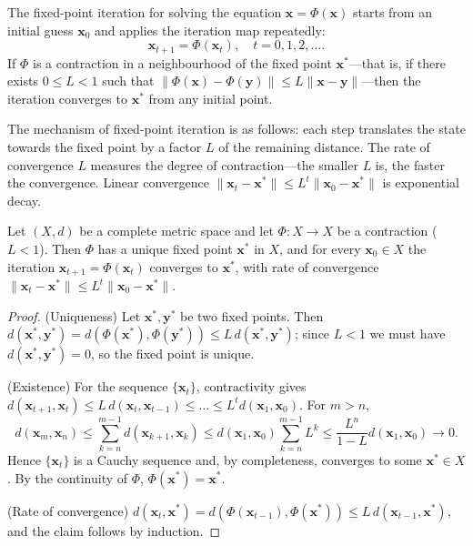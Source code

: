 \begin{definition}\label{def:fixed_point_iteration}
The fixed-point iteration for solving the equation $\mathbf{x} = \Phi(\mathbf{x})$ starts from an initial guess $\mathbf{x}_0$ and applies the iteration map repeatedly:
\[
\mathbf{x}_{t+1} = \Phi(\mathbf{x}_t), \quad t = 0, 1, 2, \dots.
\]
If $\Phi$ is a contraction in a neighbourhood of the fixed point $\mathbf{x}^*$---that is, if there exists $0 \le L < 1$ such that $\|\Phi(\mathbf{x}) - \Phi(\mathbf{y})\| \le L \|\mathbf{x} - \mathbf{y}\|$---then the iteration converges to $\mathbf{x}^*$ from any initial point.

The mechanism of fixed-point iteration is as follows: each step translates the state towards the fixed point by a factor $L$ of the remaining distance. The rate of convergence $L$ measures the degree of contraction---the smaller $L$ is, the faster the convergence. Linear convergence $\|\mathbf{x}_t - \mathbf{x}^*\| \le L^t \|\mathbf{x}_0 - \mathbf{x}^*\|$ is exponential decay.
\end{definition}

\begin{theorem}\label{thm:banach_fixed_point_algo}
Let $(X, d)$ be a complete metric space and let $\Phi: X \to X$ be a contraction ($L < 1$). Then $\Phi$ has a unique fixed point $\mathbf{x}^*$ in $X$, and for every $\mathbf{x}_0 \in X$ the iteration $\mathbf{x}_{t+1} = \Phi(\mathbf{x}_t)$ converges to $\mathbf{x}^*$, with rate of convergence $\|\mathbf{x}_t - \mathbf{x}^*\| \le L^t \|\mathbf{x}_0 - \mathbf{x}^*\|$.
\end{theorem}

\begin{proof}
(Uniqueness) Let $\mathbf{x}^*, \mathbf{y}^*$ be two fixed points. Then $d(\mathbf{x}^*, \mathbf{y}^*) = d(\Phi(\mathbf{x}^*), \Phi(\mathbf{y}^*)) \le L\, d(\mathbf{x}^*, \mathbf{y}^*)$; since $L < 1$ we must have $d(\mathbf{x}^*, \mathbf{y}^*) = 0$, so the fixed point is unique.

(Existence) For the sequence $\{\mathbf{x}_t\}$, contractivity gives $d(\mathbf{x}_{t+1}, \mathbf{x}_t) \le L\, d(\mathbf{x}_t, \mathbf{x}_{t-1}) \le \dots \le L^t d(\mathbf{x}_1, \mathbf{x}_0)$. For $m > n$,
\[
d(\mathbf{x}_m, \mathbf{x}_n) \le \sum_{k=n}^{m-1} d(\mathbf{x}_{k+1}, \mathbf{x}_k) \le d(\mathbf{x}_1, \mathbf{x}_0) \sum_{k=n}^{m-1} L^k \le \frac{L^n}{1-L} d(\mathbf{x}_1, \mathbf{x}_0) \to 0.
\]
Hence $\{\mathbf{x}_t\}$ is a Cauchy sequence and, by completeness, converges to some $\mathbf{x}^* \in X$. By the continuity of $\Phi$, $\Phi(\mathbf{x}^*) = \mathbf{x}^*$.

(Rate of convergence) $d(\mathbf{x}_t, \mathbf{x}^*) = d(\Phi(\mathbf{x}_{t-1}), \Phi(\mathbf{x}^*)) \le L\, d(\mathbf{x}_{t-1}, \mathbf{x}^*)$, and the claim follows by induction.
\end{proof}

